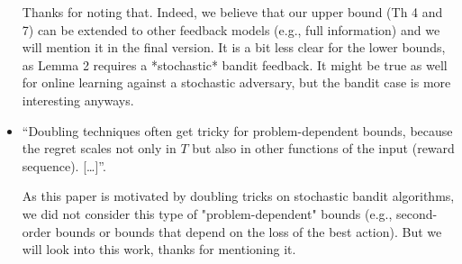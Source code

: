 \documentclass[anon,12pt]{colt2018} %
\begin{document}
\begin{itemize}

    Thanks for noting that.
    Indeed, we believe that our upper bound (Th 4 and 7) can be extended to other feedback models (e.g., full information) and we will mention it in the final version.
    It is a bit less clear for the lower bounds, as Lemma 2 requires a *stochastic* bandit feedback.
    It might be true as well for online learning against a stochastic adversary, but the bandit case is more interesting anyways.

    \item
    ``Doubling techniques often get tricky for problem-dependent bounds, because the regret scales not only in $T$ but also in other functions of the input (reward sequence). [\ldots]''.

    As this paper is motivated by doubling tricks on stochastic bandit algorithms, we did not consider this type of "problem-dependent" bounds (e.g., second-order bounds or bounds that depend on the loss of the best action).
    But we will look into this work, thanks for mentioning it.


\end{itemize}
\end{document}
